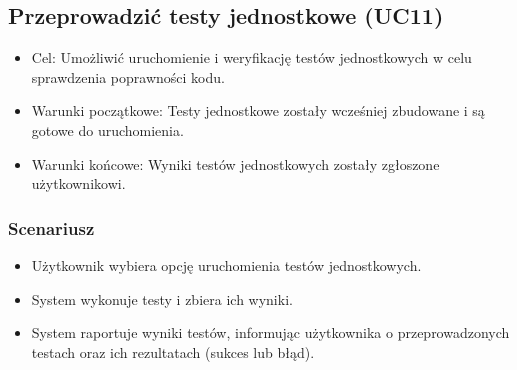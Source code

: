 \subsection{Przeprowadzić testy jednostkowe (UC11)}
\begin{itemize}
    \item Cel: Umożliwić uruchomienie i weryfikację testów jednostkowych w celu sprawdzenia poprawności kodu.
    \item Warunki początkowe: Testy jednostkowe zostały wcześniej zbudowane i są gotowe do uruchomienia.
    \item Warunki końcowe: Wyniki testów jednostkowych zostały zgłoszone użytkownikowi.
\end{itemize}

\subsubsection{Scenariusz}
\begin{itemize}
    \item Użytkownik wybiera opcję uruchomienia testów jednostkowych.
    \item System wykonuje testy i zbiera ich wyniki.
    \item System raportuje wyniki testów, informując użytkownika o przeprowadzonych testach oraz ich rezultatach (sukces lub błąd).
\end{itemize} 